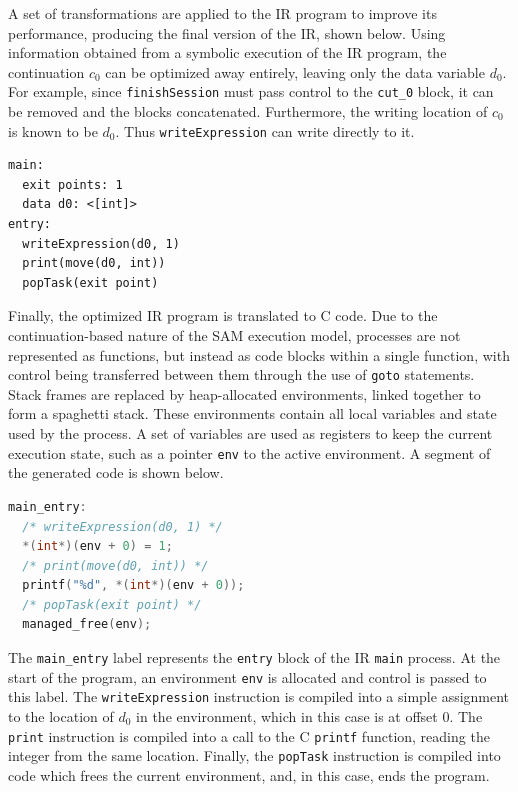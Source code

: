 \documentclass[sigconf,nonacm,natbib=true]{acmart}
\begin{document}
A set of transformations are applied to the \ac{IR} program to improve its performance, producing the final version of the \ac{IR}, shown below. Using information obtained from a symbolic execution of the \ac{IR} program, the continuation $c_0$ can be optimized away entirely, leaving only the data variable $d_0$. For example, since \texttt{finishSession} must pass control to the \texttt{cut\_0} block, it can be removed and the blocks concatenated. Furthermore, the writing location of $c_0$ is known to be $d_0$. Thus \texttt{writeExpression} can write directly to it.

\begin{lstlisting}[language=IR]
main:
  exit points: 1
  data d0: <[int]>
entry:
  writeExpression(d0, 1)
  print(move(d0, int))
  popTask(exit point)
\end{lstlisting}

Finally, the optimized \ac{IR} program is translated to C code. Due to the continuation-based nature of the \ac{SAM} execution model, processes are not represented as functions, but instead as code blocks within a single function, with control being transferred between them through the use of \texttt{goto} statements. Stack frames are replaced by heap-allocated environments, linked together to form a spaghetti stack. These environments contain all local variables and state used by the process. A set of variables are used as registers to keep the current execution state, such as a pointer \texttt{env} to the active environment. A segment of the generated code is shown below.

\begin{lstlisting}[language=C]
main_entry:
  /* writeExpression(d0, 1) */
  *(int*)(env + 0) = 1;
  /* print(move(d0, int)) */
  printf("%d", *(int*)(env + 0));
  /* popTask(exit point) */
  managed_free(env);
\end{lstlisting}

The \texttt{main\_entry} label represents the \texttt{entry} block of the \ac{IR} \texttt{main} process. At the start of the program, an environment \texttt{env} is allocated and control is passed to this label. The \texttt{writeExpression} instruction is compiled into a simple assignment to the location of $d_0$ in the environment, which in this case is at offset $0$. The \texttt{print} instruction is compiled into a call to the C \texttt{printf} function, reading the integer from the same location. Finally, the \texttt{popTask} instruction is compiled into code which frees the current environment, and, in this case, ends the program.
\end{document}
